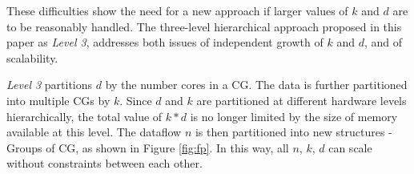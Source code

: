 \documentclass[10pt,journal,compsoc]{IEEEtran}
\begin{document}
These difficulties show the need for a new approach if larger values of $k$ and $d$ are to be reasonably handled. The three-level hierarchical approach proposed in this paper as \textit{Level 3}, addresses both issues of independent growth of $k$ and $d$, and of scalability. 

\textit{Level 3} partitions $d$ by the number cores in a CG. The data is further partitioned into multiple CGs by $k$. Since $d$ and $k$ are partitioned at different hardware levels hierarchically, the total value of $k*d$ is no longer limited by the size of memory available at this level. The dataflow $n$ is then partitioned into new structures - Groups of CG, as shown in Figure \ref{fig:fp}. In this way, all $n$, $k$, $d$ can scale without constraints between each other.



\end{document}
